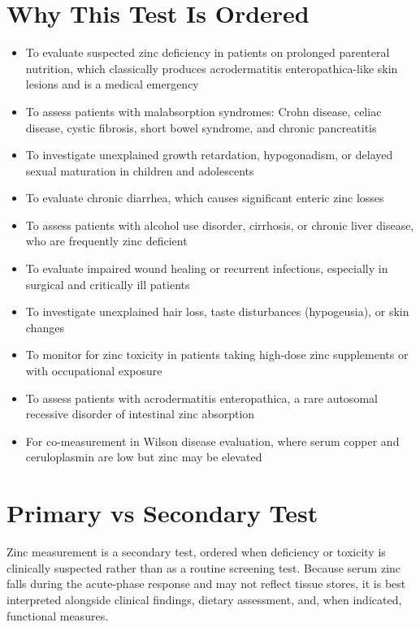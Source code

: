 \section*{Why This Test Is Ordered}
\begin{itemize}
  \item To evaluate suspected zinc deficiency in patients on prolonged parenteral nutrition, which classically produces acrodermatitis enteropathica-like skin lesions and is a medical emergency
  \item To assess patients with malabsorption syndromes: Crohn disease, celiac disease, cystic fibrosis, short bowel syndrome, and chronic pancreatitis
  \item To investigate unexplained growth retardation, hypogonadism, or delayed sexual maturation in children and adolescents
  \item To evaluate chronic diarrhea, which causes significant enteric zinc losses
  \item To assess patients with alcohol use disorder, cirrhosis, or chronic liver disease, who are frequently zinc deficient
  \item To evaluate impaired wound healing or recurrent infections, especially in surgical and critically ill patients
  \item To investigate unexplained hair loss, taste disturbances (hypogeusia), or skin changes
  \item To monitor for zinc toxicity in patients taking high-dose zinc supplements or with occupational exposure
  \item To assess patients with acrodermatitis enteropathica, a rare autosomal recessive disorder of intestinal zinc absorption
  \item For co-measurement in Wilson disease evaluation, where serum copper and ceruloplasmin are low but zinc may be elevated
\end{itemize}

\section*{Primary vs Secondary Test}
Zinc measurement is a secondary test, ordered when deficiency or toxicity is clinically suspected rather than as a routine screening test. Because serum zinc falls during the acute-phase response and may not reflect tissue stores, it is best interpreted alongside clinical findings, dietary assessment, and, when indicated, functional measures.

